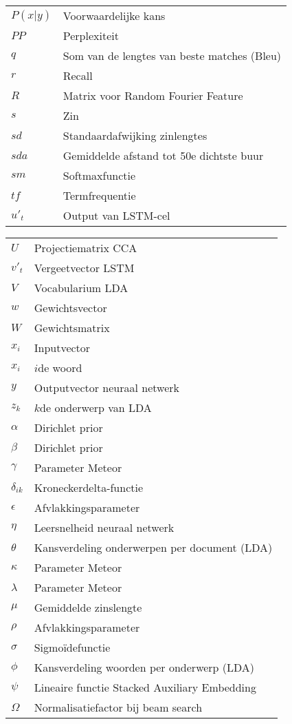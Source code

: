 \documentclass[master=cws,masteroption=ai]{kulemt}
\begin{document}
\begin{flushleft}
\begin{tabularx}{\textwidth}{@{}p{25mm}X@{}}
	$P(x|y) $& Voorwaardelijke kans\\
	$PP$ & Perplexiteit \\
	$q$ & Som van de lengtes van beste matches (Bleu)\\
	$r$& Recall \\
	$R$ & Matrix voor Random Fourier Feature \\
	$s$ & Zin \\
	$sd$ & Standaardafwijking zinlengtes\\
  $sda$ & Gemiddelde afstand tot 50e dichtste buur\\
	$sm$ & Softmaxfunctie\\
	$tf$& Termfrequentie \\
	$u'_t$ & Output van LSTM-cel \\


	  \end{tabularx}
	\end{flushleft}
	
\begin{flushleft}
	\renewcommand{\arraystretch}{1.1}
	\begin{tabularx}{\textwidth}{@{}p{25mm}X@{}}
	$U$ &Projectiematrix CCA \\
	$v'_t$& Vergeetvector LSTM \\
	$V$ &Vocabularium LDA \\
	$w$ & Gewichtsvector\\
	$W$ & Gewichtsmatrix \\
	$x_i$ & Inputvector\\
	$x_i$ &$i$de woord\\
	$y$ & Outputvector neuraal netwerk\\
	$z_{k}$ & $k$de onderwerp van LDA \\
	$\alpha$ & Dirichlet prior\\
	$\beta$ & Dirichlet prior \\
	$\gamma$ & Parameter Meteor\\
	$\delta_{ik}$ & Kroneckerdelta-functie\\
	$\epsilon$ & Afvlakkingsparameter\\
	$\eta$ & Leersnelheid neuraal netwerk\\
    $\theta$ & Kansverdeling onderwerpen per document (LDA)\\
	$\kappa$ & Parameter Meteor \\
	$\lambda$ & Parameter Meteor \\
	$\mu$ & Gemiddelde zinslengte\\
	$\rho$ & Afvlakkingsparameter\\
	$\sigma$ & Sigmo\"idefunctie \\
	$\phi$ & Kansverdeling woorden per onderwerp (LDA)\\
	$\psi$ & Lineaire functie Stacked Auxiliary Embedding \\
	$\Omega$ & Normalisatiefactor bij beam search \\
		
	\end{tabularx}
\end{flushleft}
\end{document}
